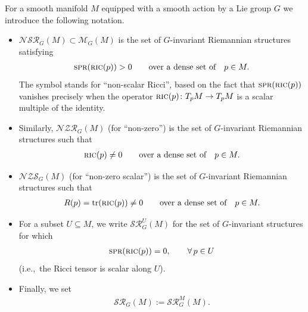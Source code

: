\documentclass[10pt,a4paper]{amsart}
\numberwithin{equation}{section}
\newcommand{\cat}[1]{\textsc{#1}}
\begin{document}
\begin{Notation}\label{not:ncr}
 For a smooth manifold $M$ equipped with a smooth action by a Lie group $G$ we introduce the following notation.
 \begin{itemize}\itemsep=0pt
 \item $\mathcal{NSR}_G(M)\subset \mathcal{M}_G(M)$ is the set of $G$-invariant Riemannian structures satisfying
 \begin{gather*}%
 \cat{spr}(\cat{ric}(p))>0 \qquad\text{over a dense set of}\quad p\in M.
 \end{gather*}
 The symbol stands for ``non-scalar Ricci'', based on the fact that $\cat{spr}(\cat{ric}(p))$ vanishes precisely when the operator $\cat{ric}(p)\colon T_pM\to T_pM$ is a scalar multiple of the identity.
 \item Similarly, $\mathcal{NZR}_G(M)$ (for ``non-zero'') is the set of $G$-invariant Riemannian structures such that
 \begin{gather*}
 \cat{ric}(p)\ne 0 \qquad\text{over a dense set of}\quad p\in M.
 \end{gather*}
 \item $\mathcal{NZS}_G(M)$ (for ``non-zero scalar'') is the set of $G$-invariant Riemannian structures such that
 \begin{gather*}
 R(p)=\mathrm{tr}(\cat{ric}(p))\ne 0 \qquad\text{over a dense set of}\quad p\in M.
 \end{gather*}
 \item For a subset $U\subseteq M$, we write $\mathcal{SR}^U_G(M)$ for the set of $G$-invariant structures for which
 \begin{gather*}
 \cat{spr}(\cat{ric}(p))=0,\qquad \forall\, p\in U
 \end{gather*}
 (i.e.,~the Ricci tensor is scalar along $U$).
 \item Finally, we set
 \begin{gather*}
 \mathcal{SR}_G(M):=\mathcal{SR}_G^M(M).
 \end{gather*}
 \end{itemize}
\end{Notation}
\end{document}
